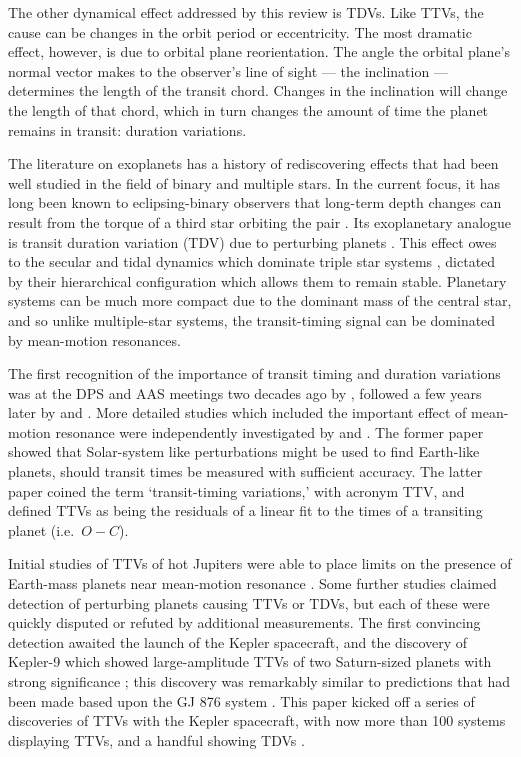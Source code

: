 \documentclass[graybox,natbib,nosecnum]{svmult}
\begin{document}
The other dynamical effect addressed by this review is TDVs.  Like TTVs, the cause can be changes in the orbit period or eccentricity.  The most dramatic effect, however, is due to orbital plane reorientation.  The angle the orbital plane's normal vector makes to the observer's line of sight --- the inclination --- determines the length of the transit chord.  Changes in the inclination will change the length of that chord, which in turn changes the amount of time the planet remains in transit: duration variations. 

The literature on exoplanets has a history of rediscovering effects that had been well studied in the field of binary and multiple stars.  In the current focus, it has long been known to eclipsing-binary observers that long-term depth changes can result from the torque of a third star orbiting the pair \citep{1971Mayer}.  Its exoplanetary analogue is transit duration variation (TDV) due to perturbing planets \citep{2002ApJ...564.1019M}. This effect owes to the secular and tidal dynamics which dominate triple star systems \citep{2003A&A...398.1091B}, dictated by their hierarchical configuration which allows them to remain stable. Planetary systems can be much more compact due to the dominant mass of the central star, and so unlike multiple-star systems, the transit-timing signal can be dominated by mean-motion resonances.

The first recognition of the importance of transit timing and duration variations was at the DPS and AAS meetings two decades ago by \citet{1996DPS....28.1208D,1996BAAS...28.1112D}, followed a few years later by \citet{2002ApJ...564.1019M} and \citet{Schneider2003,Schneider2004}.  More detailed studies which included the important effect of mean-motion resonance were independently investigated by \citet{2005Sci...307.1288H} and \citet{2005MNRAS.359..567A}.  The former paper showed that Solar-system like perturbations might be used to find Earth-like planets, should transit times be measured with sufficient accuracy.  The latter paper coined the term `transit-timing variations,' with acronym TTV, and defined TTVs as being the residuals of a linear fit to the times of a transiting planet (i.e.\ $O-C$).

Initial studies of TTVs of hot Jupiters were able to place limits on the presence of Earth-mass planets near mean-motion resonance \citep{2005MNRAS.364L..96S}.  Some further studies claimed detection of perturbing planets causing TTVs or TDVs, but each of these were quickly disputed or refuted by additional measurements.  The first convincing detection awaited the launch of the Kepler spacecraft, and the discovery of Kepler-9 which showed large-amplitude TTVs of two Saturn-sized planets with strong significance \citep{2010Sci...330...51H}; this discovery was remarkably similar to predictions that had been made based upon the GJ 876 system \citep{2005MNRAS.359..567A}.  This paper kicked off a series of discoveries of TTVs with the Kepler spacecraft, with now more than 100 systems displaying TTVs, and a handful showing TDVs \citep{2016ApJS..225....9H}.
\end{document}
